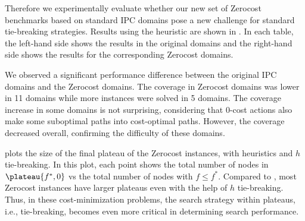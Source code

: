 

Therefore we experimentally evaluate whether our new set of Zerocost benchmarks based on standard IPC domains pose a new challenge for
standard tie-breaking strategies. Results using the \lmcut
heuristic are shown in %
. In each table,
the left-hand side shows the results in the original domains and the right-hand side
shows the results for the corresponding Zerocost domains.

We observed a significant
performance difference between the original IPC domains and the Zerocost
domains.
The coverage in Zerocost domains
was lower in 11 domains while more instances were solved
in 5 domains.
The coverage increase in some domains is not surprising, considering that 0-cost actions also make some suboptimal paths into cost-optimal paths. However, the coverage decreased overall, confirming the difficulty of these domains.

 plots the size of the final plateau of the
Zerocost instances, with \lmcut heuristics and $h$ tie-breaking. In this plot,
each point shows the total number of nodes in $\plateau{f^*,0}$ vs the
total number of nodes with $f\leq f^*$. Compared to ,
most Zerocost instances have larger plateaus even with the help of
$h$ tie-breaking.  Thus, in these cost-minimization problems, the search
strategy within plateaus, i.e., tie-breaking, becomes even more critical
in determining search performance.

